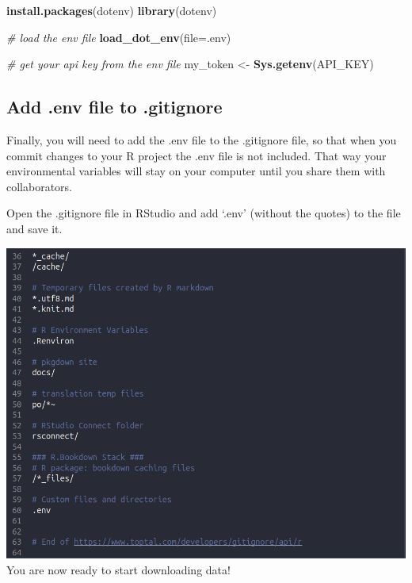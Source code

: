 \documentclass[
]{book}
\newenvironment{Shaded}{\begin{snugshade}}{\end{snugshade}}
\newcommand{\AttributeTok}[1]{\textcolor[rgb]{0.13,0.29,0.53}{#1}}
\newcommand{\CommentTok}[1]{\textcolor[rgb]{0.56,0.35,0.01}{\textit{#1}}}
\newcommand{\FunctionTok}[1]{\textcolor[rgb]{0.13,0.29,0.53}{\textbf{#1}}}
\newcommand{\NormalTok}[1]{#1}
\newcommand{\OtherTok}[1]{\textcolor[rgb]{0.56,0.35,0.01}{#1}}
\newcommand{\StringTok}[1]{\textcolor[rgb]{0.31,0.60,0.02}{#1}}
\begin{document}
\begin{Shaded}
\begin{Highlighting}[]
\FunctionTok{install.packages}\NormalTok{(}\StringTok{\textquotesingle{}dotenv\textquotesingle{}}\NormalTok{)}
\FunctionTok{library}\NormalTok{(dotenv)}

\CommentTok{\# load the env file}
\FunctionTok{load\_dot\_env}\NormalTok{(}\AttributeTok{file=}\StringTok{\textquotesingle{}.env\textquotesingle{}}\NormalTok{)}

\CommentTok{\# get your api key from the env file}
\NormalTok{my\_token }\OtherTok{\textless{}{-}} \FunctionTok{Sys.getenv}\NormalTok{(}\StringTok{\textquotesingle{}API\_KEY\textquotesingle{}}\NormalTok{)}
\end{Highlighting}
\end{Shaded}

\subsection{Add .env file to .gitignore}\label{add-.env-file-to-.gitignore}

Finally, you will need to add the .env file to the .gitignore file, so that when you commit changes to your R project the .env file is not included. That way your environmental variables will stay on your computer until you share them with collaborators.

Open the .gitignore file in RStudio and add `.env' (without the quotes) to the file and save it.

\includegraphics{images/git-ignore-env.png}
You are now ready to start downloading data!
\end{document}
